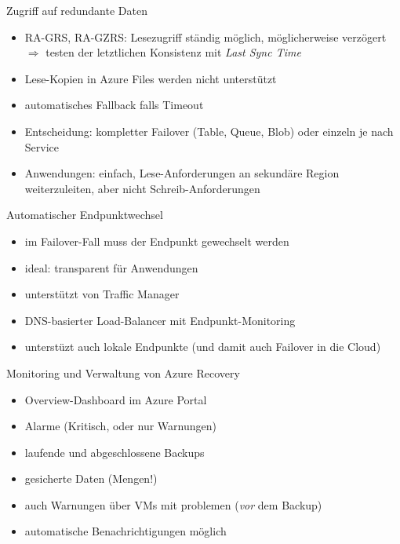 \begin{flashcard}[Definition]{Zugriff auf redundante Daten}
  \begin{itemize}
    \item RA-GRS, RA-GZRS: Lesezugriff ständig möglich, möglicherweise verzögert\newline
    $\Rightarrow$ testen der letztlichen Konsistenz mit \emph{Last Sync Time}
    \item Lese-Kopien in Azure Files werden nicht unterstützt
    \item automatisches Fallback falls Timeout
    \item Entscheidung: kompletter Failover (Table, Queue, Blob) oder einzeln je nach Service
    \item Anwendungen: einfach, Lese-Anforderungen an sekundäre Region weiterzuleiten, aber nicht Schreib-Anforderungen
  \end{itemize}
\end{flashcard}

\begin{flashcard}[Definition]{Automatischer Endpunktwechsel}
  \begin{itemize}
    \item im Failover-Fall muss der Endpunkt gewechselt werden
    \item ideal: transparent für Anwendungen
    \item unterstützt von Traffic Manager
    \item DNS-basierter Load-Balancer mit Endpunkt-Monitoring
    \item unterstüzt auch lokale Endpunkte\newline
    (und damit auch Failover in die Cloud)
  \end{itemize}
\end{flashcard}


\begin{flashcard}[Definition]{Monitoring und Verwaltung von Azure Recovery}
  \begin{itemize}
    \item Overview-Dashboard im Azure Portal
    \item Alarme (Kritisch, oder nur Warnungen)
    \item laufende und abgeschlossene Backups
    \item gesicherte Daten (Mengen!)
    \item auch Warnungen über VMs mit problemen (\emph{vor} dem Backup)
    \item automatische Benachrichtigungen möglich
  \end{itemize}
\end{flashcard}

